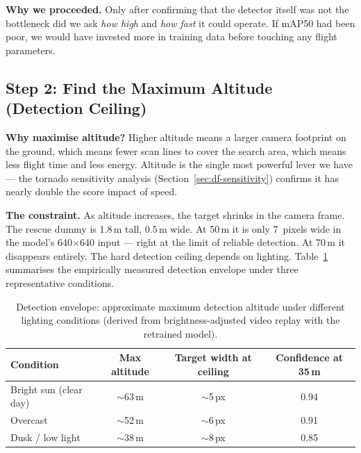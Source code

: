 \documentclass[10pt,a4paper]{article}
\newcommand{\compactTable}{\small\setlength{\tabcolsep}{3pt}\renewcommand{\arraystretch}{1.05}}
\begin{document}
\textbf{Why we proceeded.} Only after confirming that the detector itself was not the bottleneck did we ask \emph{how high} and \emph{how fast} it could operate. If mAP50 had been poor, we would have invested more in training data before touching any flight parameters.


\subsection{Step 2: Find the Maximum Altitude (Detection Ceiling)}\label{sec:step2}

\textbf{Why maximise altitude?} Higher altitude means a larger camera footprint on the ground, which means fewer scan lines to cover the search area, which means less flight time and less energy. Altitude is the single most powerful lever we have --- the tornado sensitivity analysis (Section~\ref{sec:df-sensitivity}) confirms it has nearly double the score impact of speed.

\textbf{The constraint.} As altitude increases, the target shrinks in the camera frame. The rescue dummy is 1.8\,m tall, 0.5\,m wide. At 50\,m it is only 7~pixels wide in the model's 640$\times$640 input --- right at the limit of reliable detection. At 70\,m it disappears entirely. The hard detection ceiling depends on lighting. Table~\ref{tab:df-detection-envelope} summarises the empirically measured detection envelope under three representative conditions.

\begin{table}[H]
  \centering\compactTable
  \caption{Detection envelope: approximate maximum detection altitude under different lighting conditions (derived from brightness-adjusted video replay with the retrained model).}\label{tab:df-detection-envelope}
  \begin{tabularx}{\linewidth}{@{}l c c c@{}}
    \toprule
    \textbf{Condition} & \textbf{Max altitude} & \textbf{Target width at ceiling} & \textbf{Confidence at 35\,m} \\
    \midrule
    Bright sun (clear day) & $\sim$63\,m & $\sim$5\,px & 0.94 \\
    Overcast              & $\sim$52\,m & $\sim$6\,px & 0.91 \\
    Dusk / low light      & $\sim$38\,m & $\sim$8\,px & 0.85 \\
    \bottomrule
  \end{tabularx}
\end{table}
\end{document}
